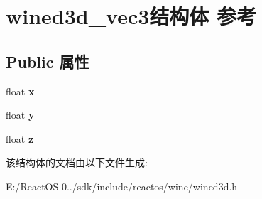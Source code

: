 \hypertarget{structwined3d__vec3}{}\section{wined3d\+\_\+vec3结构体 参考}
\label{structwined3d__vec3}
\subsection*{Public 属性}
\begin{DoxyCompactItemize}
\item 
\mbox{\label{structwined3d__vec3_a9a9a05a14b4bc852cdf5bddd5e65dab7}} 
float {\bfseries x}
\item 
\mbox{\label{structwined3d__vec3_a11ddbf5ccb6ad7ccab4420d4c0936c90}} 
float {\bfseries y}
\item 
\mbox{\label{structwined3d__vec3_a563d3d4a07dbad6c3b4d5da20e20c2eb}} 
float {\bfseries z}
\end{DoxyCompactItemize}


该结构体的文档由以下文件生成\+:\begin{DoxyCompactItemize}
\item 
E\+:/\+React\+O\+S-\/0../sdk/include/reactos/wine/wined3d.\+h\end{DoxyCompactItemize}
